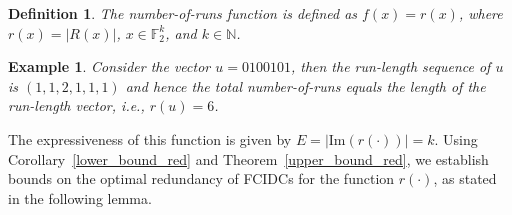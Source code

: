 \documentclass[11 pt]{article}
\numberwithin{equation}{section}
\newtheorem{definition}[theorem]{Definition}
\newtheorem{example}[theorem]{Example}
\begin{document}
    \begin{definition}
    \label{def:number-of-runs}
        The number-of-runs function is defined as $f(x) = r(x)$, where $r(x) = |R(x)|$, $x \in \mathbb{F}_2^k$, and $k \in \mathbb{N}$.
    \end{definition}

    \begin{example}
        Consider the vector $u = 0100101$, then the run-length sequence of $u$ is $(1,1,2,1,1,1)$ and hence the total number-of-runs equals the length of the run-length vector, i.e., $r(u) = 6$.
    \end{example}

    The expressiveness of this function is given by $E = |\mathrm{Im}(r(\cdot))| = k$. Using Corollary~\ref{lower_bound_red} and Theorem~\ref{upper_bound_red}, we establish bounds on the optimal redundancy of FCIDCs for the function $r(\cdot)$, as stated in the following lemma.
\end{document}
